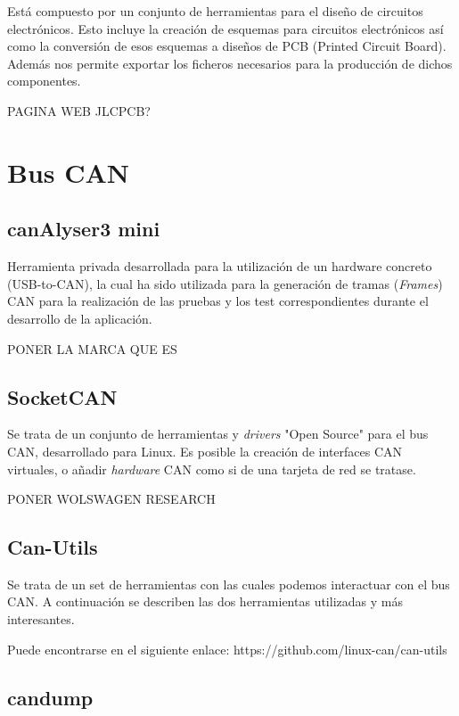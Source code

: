 Está compuesto por un conjunto de herramientas para el diseño de circuitos electrónicos. Esto incluye la creación de esquemas para circuitos electrónicos así como la conversión de esos esquemas a diseños de PCB (Printed Circuit Board). Además nos permite exportar los ficheros necesarios para la producción de dichos componentes.

PAGINA WEB JLCPCB?

\section{Bus CAN}\label{bus_can}

\subsection{canAlyser3 mini}\label{canalyser3_mini}

Herramienta privada desarrollada para la utilización de un hardware concreto (USB-to-CAN), la cual ha sido utilizada para la generación de tramas (\emph{Frames}) CAN para la realización de las pruebas y los test correspondientes durante el desarrollo de la aplicación.

PONER LA MARCA QUE ES

\subsection{SocketCAN}\label{socketcan}

Se trata de un conjunto de herramientas y \emph{drivers} "Open Source" para el bus CAN, desarrollado para Linux. Es posible la creación de interfaces CAN virtuales, o añadir \emph{hardware} CAN como si de una tarjeta de red se tratase.

PONER WOLSWAGEN RESEARCH

\subsection{Can-Utils}\label{can-utils}

Se trata de un set de herramientas con las cuales podemos interactuar con el bus CAN. A continuación se describen las dos herramientas utilizadas y más interesantes.

Puede encontrarse en el siguiente enlace: https://github.com/linux-can/can-utils

\subsection{candump}\label{candump}

